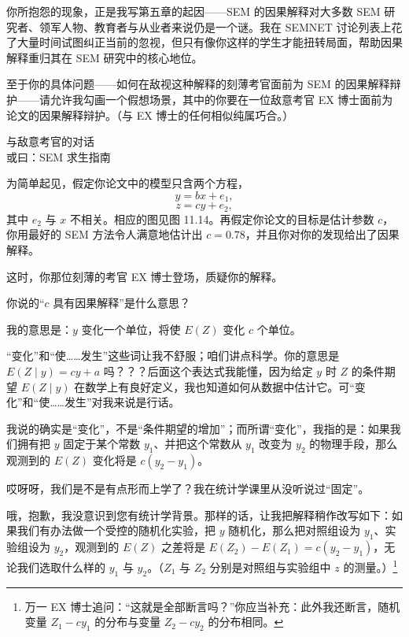 
你所抱怨的现象，正是我写第五章的起因——SEM 的因果解释对大多数 SEM 研究者、领军人物、教育者与从业者来说仍是一个谜。我在 SEMNET 讨论列表上花了大量时间试图纠正当前的忽视，但只有像你这样的学生才能扭转局面，帮助因果解释重归其在 SEM 研究中的核心地位。

至于你的具体问题——如何在敌视这种解释的刻薄考官面前为 SEM 的因果解释辩护——请允许我勾画一个假想场景，其中的你要在一位敌意考官 EX 博士面前为论文的因果解释辩护。（与 EX 博士的任何相似纯属巧合。）

\begin{center}
{\heiti 与敌意考官的对话}\\[0.2em]
{\heiti 或曰：SEM 求生指南}
\end{center}

为简单起见，假定你论文中的模型只含两个方程，
\begin{equation}
y=bx+e_1, \tag{11.21}
\end{equation}
\begin{equation}
z=cy+e_2, \tag{11.22}
\end{equation}
其中 $e_2$ 与 $x$ 不相关。相应的图见图 11.14。再假定你论文的目标是估计参数 $c$，你用最好的 SEM 方法令人满意地估计出 $c=0.78$，并且你对你的发现给出了因果解释。

这时，你那位刻薄的考官 EX 博士登场，质疑你的解释。

你说的“$c$ 具有因果解释”是什么意思？

我的意思是：$y$ 变化一个单位，将使 $E(Z)$ 变化 $c$ 个单位。

“变化”和“使……发生”这些词让我不舒服；咱们讲点科学。你的意思是 $E(Z\mid y)=cy+a$ 吗？？？后面这个表达式我能懂，因为给定 $y$ 时 $Z$ 的条件期望 $E(Z\mid y)$ 在数学上有良好定义，我也知道如何从数据中估计它。可“变化”和“使……发生”对我来说是行话。

我说的确实是“变化”，不是“条件期望的增加”；而所谓“变化”，我指的是：如果我们拥有把 $y$ 固定于某个常数 $y_1$、并把这个常数从 $y_1$ 改变为 $y_2$ 的物理手段，那么观测到的 $E(Z)$ 变化将是 $c(y_2-y_1)$。

哎呀呀，我们是不是有点形而上学了？我在统计学课里从没听说过“固定”。

哦，抱歉，我没意识到您有统计学背景。那样的话，让我把解释稍作改写如下：如果我们有办法做一个受控的随机化实验，把 $y$ 随机化，那么把对照组设为 $y_1$、实验组设为 $y_2$，观测到的 $E(Z)$ 之差将是 $E(Z_2)-E(Z_1)=c(y_2-y_1)$，无论我们选取什么样的 $y_1$ 与 $y_2$。（$Z_1$ 与 $Z_2$ 分别是对照组与实验组中 $z$ 的测量。）\footnote{万一 EX 博士追问：“这就是全部断言吗？”你应当补充：此外我还断言，随机变量 $Z_1-cy_1$ 的分布与变量 $Z_2-cy_2$ 的分布相同。}

